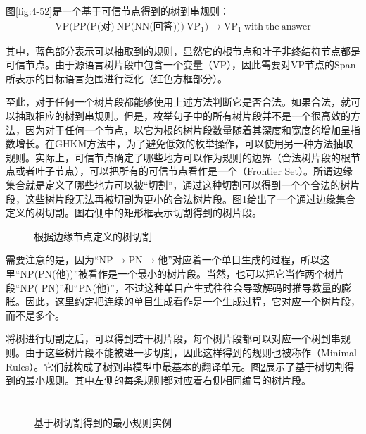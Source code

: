 \parinterval 图\ref{fig:4-52}是一个基于可信节点得到的树到串规则：
\begin{eqnarray}
\textrm{VP(PP(P(对)}\ \textrm{NP(NN(回答)))}\ \textrm{VP}_1) \rightarrow \textrm{VP}_1\ \textrm{with}\ \textrm{the}\ \textrm{answer} \nonumber
\end{eqnarray}

\noindent 其中，蓝色部分表示可以抽取到的规则，显然它的根节点和叶子非终结符节点都是可信节点。由于源语言树片段中包含一个变量（VP），因此需要对VP节点的Span所表示的目标语言范围进行泛化（红色方框部分）。

\parinterval 至此，对于任何一个树片段都能够使用上述方法判断它是否合法。如果合法，就可以抽取相应的树到串规则。但是，枚举句子中的所有树片段并不是一个很高效的方法，因为对于任何一个节点，以它为根的树片段数量随着其深度和宽度的增加呈指数增长。在GHKM方法中，为了避免低效的枚举操作，可以使用另一种方法抽取规则。实际上，可信节点确定了哪些地方可以作为规则的边界（合法树片段的根节点或者叶子节点），可以把所有的可信节点看作是一个{\small{}}（Frontier Set）。所谓边缘集合就是定义了哪些地方可以被``切割''，通过这种切割可以得到一个个合法的树片段，这些树片段无法再被切割为更小的合法树片段。图\ref{fig:4-53}给出了一个通过边缘集合定义的树切割。图右侧中的矩形框表示切割得到的树片段。

\begin{figure}[htp]
\centering

\caption{根据边缘节点定义的树切割}
\label{fig:4-53}
\end{figure}

\parinterval 需要注意的是，因为``NP$\rightarrow$PN$\rightarrow$他''对应着一个单目生成的过程，所以这里``NP(PN(他))''被看作是一个最小的树片段。当然，也可以把它当作两个树片段``NP( PN)''和``PN(他)''，不过这种单目产生式往往会导致解码时推导数量的膨胀。因此，这里约定把连续的单目生成看作是一个生成过程，它对应一个树片段，而不是多个。

\parinterval 将树进行切割之后，可以得到若干树片段，每个树片段都可以对应一个树到串规则。由于这些树片段不能被进一步切割，因此这样得到的规则也被称作{\small{}}（Minimal Rules）。它们就构成了树到串模型中最基本的翻译单元。图\ref{fig:4-54}展示了基于树切割得到的最小规则。其中左侧的每条规则都对应着右侧相同编号的树片段。

\begin{figure}[htp]
\centering
\begin{tabular}{l l}
\subfigure{} &  \subfigure{}
\end{tabular}
\caption{基于树切割得到的最小规则实例}
\label{fig:4-54}
\end{figure}

